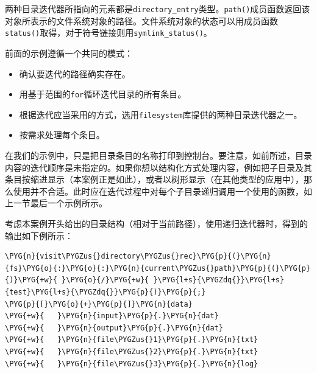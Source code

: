 
两种目录迭代器所指向的元素都是\texttt{directory\_\allowbreak{}entry}类型。\texttt{path()}成员函数返回该对象所表示的文件系统对象的路径。文件系统对象的状态可以用成员函数\texttt{status()}取得，对于符号链接则用\texttt{symlink\_\allowbreak{}status()}。



前面的示例遵循一个共同的模式：



\begin{itemize}
\item 确认要迭代的路径确实存在。



\item 用基于范围的\texttt{for}循环迭代目录的所有条目。



\item 根据迭代应当采用的方式，选用\texttt{filesystem}库提供的两种目录迭代器之一。



\item 按需求处理每个条目。

\end{itemize}



在我们的示例中，只是把目录条目的名称打印到控制台。要注意，如前所述，目录内容的迭代顺序是未指定的。如果你想以结构化方式处理内容，例如把子目录及其条目按缩进显示（本案例正是如此），或者以树形显示（在其他类型的应用中），那么使用并不合适。此时应在迭代过程中对每个子目录递归调用一个使用的函数，如上一节最后一个示例所示。



考虑本案例开头给出的目录结构（相对于当前路径），使用递归迭代器时，得到的输出如下例所示：



\begin{codeblockbg}
\begin{Verbatim}[commandchars=\\\{\},breaklines=true,breakanywhere=true,fontsize=\codefont,xleftmargin=17bp]
\PYG{n}{visit\PYGZus{}directory\PYGZus{}rec}\PYG{p}{(}\PYG{n}{fs}\PYG{o}{:}\PYG{o}{:}\PYG{n}{current\PYGZus{}path}\PYG{p}{(}\PYG{p}{)}\PYG{+w}{ }\PYG{o}{/}\PYG{+w}{ }\PYG{l+s}{\PYGZdq{}}\PYG{l+s}{test}\PYG{l+s}{\PYGZdq{}}\PYG{p}{)}\PYG{p}{;}
\PYG{p}{[}\PYG{o}{+}\PYG{p}{]}\PYG{n}{data}
\PYG{+w}{   }\PYG{n}{input}\PYG{p}{.}\PYG{n}{dat}
\PYG{+w}{   }\PYG{n}{output}\PYG{p}{.}\PYG{n}{dat}
\PYG{+w}{   }\PYG{n}{file\PYGZus{}1}\PYG{p}{.}\PYG{n}{txt}
\PYG{+w}{   }\PYG{n}{file\PYGZus{}2}\PYG{p}{.}\PYG{n}{txt}
\PYG{+w}{   }\PYG{n}{file\PYGZus{}3}\PYG{p}{.}\PYG{n}{log}
\end{Verbatim}
\end{codeblockbg}


